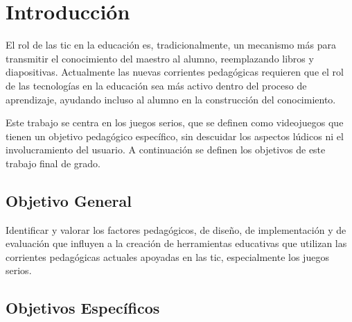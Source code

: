 
\section{Introducción}

El rol de las \gls{tic} en la educación es, tradicionalmente, un mecanismo más
para transmitir el conocimiento del maestro al alumno, reemplazando libros y
diapositivas\cite{laptop:instructionism}. Actualmente las nuevas corrientes
pedagógicas requieren que el rol de las tecnologías en la educación sea más
activo dentro del proceso de aprendizaje, ayudando incluso al alumno en la
construcción del conocimiento.

Este trabajo se centra en los juegos serios, que se definen como videojuegos que
tienen un objetivo pedagógico específico, sin descuidar los aspectos lúdicos ni
el involucramiento del usuario\cite{sg:aoverview,ludus:sg,abt1987serious}. A
continuación se definen los objetivos de este trabajo final de grado.

\subsection{Objetivo General}

Identificar y valorar los factores pedagógicos, de diseño, de implementación y
de evaluación que influyen a la creación de herramientas educativas que utilizan
las corrientes pedagógicas actuales apoyadas en las \gls{tic}, especialmente los juegos serios. 

\subsection{Objetivos Específicos}

